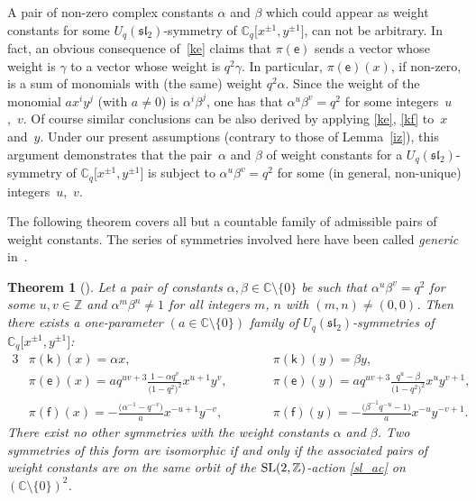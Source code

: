 \documentclass[10pt,a4paper]{amsart}
\numberwithin{equation}{section}
\newtheorem{Theorem}{Theorem}[section]
\begin{document}
A pair of non-zero complex constants $\alpha$ and $\beta$ which could appear as weight constants for some $U_q(\mathfrak{sl}_2)$-symmetry of $\mathbb{C}_q\big[x^{\pm 1},y^{\pm 1}\big]$, can not be arbitrary. In fact, an obvious consequence of~\eqref{ke} claims that $\pi(\mathsf{e})$ sends a vector whose weight is $\gamma$ to a vector whose weight is $q^2\gamma$. In particular, $\pi(\mathsf{e})(x)$, if non-zero, is a sum of monomials with (the same) weight $q^2\alpha$. Since the weight of the monomial $ax^iy^j$ (with $a\ne 0$) is $\alpha^i\beta^j$, one has that $\alpha^u\beta^v=q^2$ for some integers~$u$,~$v$. Of course similar conclusions can be also derived by applying \eqref{ke}, \eqref{kf} to~$x$ and~$y$. Under our present assumptions (contrary to those of Lemma~\ref{iz}), this argument demonstrates that the pair~$\alpha$ and $\beta$ of weight constants for a $U_q(\mathfrak{sl}_2)$-symmetry of $\mathbb{C}_q\big[x^{\pm 1},y^{\pm 1}\big]$ is subject to $\alpha^u\beta^v=q^2$ for some (in general, non-unique) integers~$u$,~$v$.

The following theorem covers all but a countable family of admissible pairs of weight constants. The series of symmetries involved here have been called {\it generic} in~\cite{S}.

\begin{Theorem}[{\cite[Theorem 4.1, type (III)]{S}}]\label{gener}
Let a pair of constants $\alpha,\beta\in\mathbb{C}{\setminus}\{0\}$ be such that $\alpha^u\beta^v=q^2$ for some $u,v\in\mathbb{Z}$ and $\alpha^m\beta^n\ne 1$ for all integers $m$, $n$ with $(m,n)\ne(0,0)$. Then there exists a one-parameter $(a\in\mathbb{C}{\setminus}\{0\})$ family of $U_q(\mathfrak{sl}_2)$-symmetries of $\mathbb{C}_q\big[x^{\pm 1},y^{\pm 1}\big]$:
\begin{alignat}{3}
&\pi(\mathsf{k})(x)=\alpha x, \qquad & &\pi(\mathsf{k})(y) =\beta y, & \label{gener_k}\\
& \pi(\mathsf{e})(x) =aq^{uv+3}\frac{1-\alpha q^v}{\big(1-q^2\big)^2}x^{u+1}y^v, \qquad & & \pi(\mathsf{e})(y) =aq^{uv+3}\frac{q^u-\beta}{\big(1-q^2\big)^2}x^uy^{v+1}, & \label{gener_e}\\
& \pi(\mathsf{f})(x) =-\frac{\big(\alpha^{-1}-q^{-v}\big)}{a}x^{-u+1}y^{-v},\qquad && \pi(\mathsf{f})(y) =-\frac{\big(\beta^{-1}q^{-u}-1\big)}{a}x^{-u}y^{-v+1}. &\label{gener_f}
\end{alignat}
There exist no other symmetries with the weight constants $\alpha$ and $\beta$. Two symmetries of this form are isomorphic if and only if the associated pairs of weight constants are on the same orbit of the ${\rm SL}(2,\mathbb{Z})$-action \eqref{sl_ac} on $(\mathbb{C}{\setminus}\{0\})^2$.
\end{Theorem}
\end{document}
